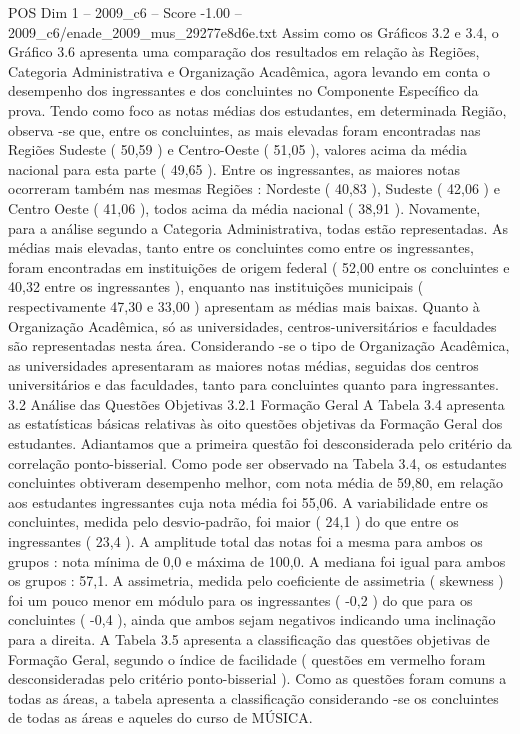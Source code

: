 \begin{textsample}{POS Dim 1 – 2009\_c6 – Score -1.00 – 2009\_c6/enade\_2009\_mus\_29277e8d6e.txt}
Assim como os Gráficos 3.2 e 3.4, o Gráfico 3.6 apresenta uma comparação dos resultados em relação às Regiões, Categoria Administrativa e Organização Acadêmica, agora levando em conta o desempenho dos ingressantes e dos concluintes no Componente Específico da prova.
Tendo como foco as notas médias dos estudantes, em determinada Região, observa -se que, entre os concluintes, as mais elevadas foram encontradas nas Regiões Sudeste ( 50,59 ) e Centro-Oeste ( 51,05 ), valores acima da média nacional para esta parte ( 49,65 ).
Entre os ingressantes, as maiores notas ocorreram também nas mesmas Regiões : Nordeste ( 40,83 ), Sudeste ( 42,06 ) e Centro Oeste ( 41,06 ), todos acima da média nacional ( 38,91 ).
Novamente, para a análise segundo a Categoria Administrativa, todas estão representadas.
As médias mais elevadas, tanto entre os concluintes como entre os ingressantes, foram encontradas em instituições de origem federal ( 52,00 entre os concluintes e 40,32 entre os ingressantes ), enquanto nas instituições municipais ( respectivamente 47,30 e 33,00 ) apresentam as médias mais baixas.
Quanto à Organização Acadêmica, só as universidades, centros-universitários e faculdades são representadas nesta área.
Considerando -se o tipo de Organização Acadêmica, as universidades apresentaram as maiores notas médias, seguidas dos centros universitários e das faculdades, tanto para concluintes quanto para ingressantes. 3.2 Análise das Questões Objetivas 3.2.1 Formação Geral A Tabela 3.4 apresenta as estatísticas básicas relativas às oito questões objetivas da Formação Geral dos estudantes.
Adiantamos que a primeira questão foi desconsiderada pelo critério da correlação ponto-bisserial.
Como pode ser observado na Tabela 3.4, os estudantes concluintes obtiveram desempenho melhor, com nota média de 59,80, em relação aos estudantes ingressantes cuja nota média foi 55,06.
A variabilidade entre os concluintes, medida pelo desvio-padrão, foi maior ( 24,1 ) do que entre os ingressantes ( 23,4 ).
A amplitude total das notas foi a mesma para ambos os grupos : nota mínima de 0,0 e máxima de 100,0.
A mediana foi igual para ambos os grupos : 57,1.
A assimetria, medida pelo coeficiente de assimetria ( skewness ) foi um pouco menor em módulo para os ingressantes ( -0,2 ) do que para os concluintes ( -0,4 ), ainda que ambos sejam negativos indicando uma inclinação para a direita.
A Tabela 3.5 apresenta a classificação das questões objetivas de Formação Geral, segundo o índice de facilidade ( questões em vermelho foram desconsideradas pelo critério ponto-bisserial ).
Como as questões foram comuns a todas as áreas, a tabela apresenta a classificação considerando -se os concluintes de todas as áreas e aqueles do curso de MÚSICA.

\end{textsample}
